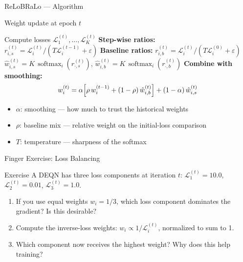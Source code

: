 \documentclass[aspectratio=169,11pt]{beamer}
\newcommand{\emphc}[1]{\textcolor{harvardcrimson}{#1}}
\begin{document}
\begin{frame}{ReLoBRaLo --- Algorithm}
\begin{block}{Weight update at epoch $t$}
\begin{algorithmic}[1]
\STATE Compute losses $\mathcal{L}_1^{(t)}, \ldots, \mathcal{L}_K^{(t)}$
\STATE \textbf{Step-wise ratios:}\; $r_{i,s}^{(t)}=\mathcal{L}_i^{(t)}/(T\mathcal{L}_i^{(t-1)}+\varepsilon)$
\STATE \textbf{Baseline ratios:}\; $r_{i,b}^{(t)}=\mathcal{L}_i^{(t)}/(T\mathcal{L}_i^{(0)}+\varepsilon)$
\STATE $\hat w_{i,s}^{(t)}=K\,\operatorname{softmax}_i(r_{\cdot,s}^{(t)})$,\quad
       $\hat w_{i,b}^{(t)}=K\,\operatorname{softmax}_i(r_{\cdot,b}^{(t)})$
    \STATE \textbf{Combine with smoothing:}
\[
    w_i^{(t)} = \alpha \Bigl[\rho \, w_i^{(t-1)} + (1-\rho) \, \hat{w}_{i,b}^{(t)}\Bigr]
    + (1-\alpha) \, \hat{w}_{i,s}^{(t)}
\]
\end{algorithmic}
\end{block}

\vspace{0.3cm}
\begin{itemize}
    \item $\alpha$: smoothing --- how much to trust the historical weights
    \item $\rho$: baseline mix --- relative weight on the initial-loss comparison
    \item $T$: temperature --- sharpness of the softmax
\end{itemize}
\end{frame}

\begin{frame}{\exercisepause{} Finger Exercise: Loss Balancing}
\begin{exampleblock}{Exercise}
A DEQN has three loss components at iteration $t$: $\mathcal{L}_1^{(t)} = 10.0$, $\mathcal{L}_2^{(t)} = 0.01$, $\mathcal{L}_3^{(t)} = 1.0$.
\begin{enumerate}
    \item If you use \emphc{equal weights} $w_i = 1/3$, which loss component dominates the gradient? Is this desirable?
    \item Compute the \emphc{inverse-loss weights}: $w_i \propto 1/\mathcal{L}_i^{(t)}$, normalized to sum to 1.
    \item Which component now receives the highest weight? Why does this help training?
\end{enumerate}
\end{exampleblock}
\end{frame}
\end{document}

